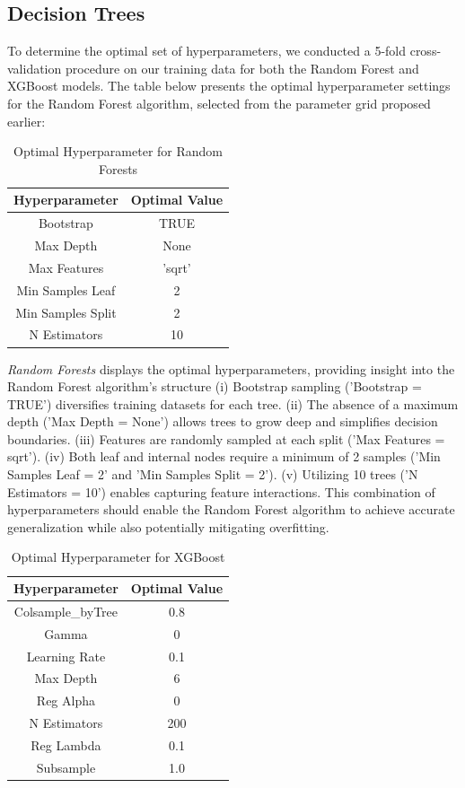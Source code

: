 \documentclass[conference]{IEEEtran}
\begin{document}
\subsection{Decision Trees}

To determine the optimal set of hyperparameters, we conducted a 5-fold cross-validation procedure on our training data for both the Random Forest and XGBoost models. The table below presents the optimal hyperparameter settings for the Random Forest algorithm, selected from the parameter grid proposed earlier:

\begin{table}[H]
\centering
\caption{Optimal Hyperparameter for Random Forests}
\begin{tabular}{|c|c|}
\hline
Hyperparameter & Optimal Value \\
\hline
Bootstrap & TRUE \\
\hline
Max Depth & None \\
\hline
Max Features & 'sqrt' \\
\hline
Min Samples Leaf & 2 \\
\hline
Min Samples Split & 2 \\
\hline
N Estimators & 10 \\
\hline
\end{tabular}
\label{tab:rf_hyper}
\end{table}

\emph{Random Forests} displays the optimal hyperparameters, providing insight into the Random Forest algorithm’s structure (i) Bootstrap sampling ('Bootstrap = TRUE') diversifies training datasets for each tree. (ii) The absence of a maximum depth ('Max Depth = None') allows trees to grow deep and simplifies decision boundaries. (iii) Features are randomly sampled at each split ('Max Features = sqrt'). (iv) Both leaf and internal nodes require a minimum of 2 samples ('Min Samples Leaf = 2' and 'Min Samples Split = 2'). (v) Utilizing 10 trees ('N Estimators = 10') enables capturing feature interactions. This combination of hyperparameters should enable the Random Forest algorithm to achieve accurate generalization while also potentially mitigating overfitting.

\begin{table}[H]
\centering
\caption{Optimal Hyperparameter for XGBoost}
\begin{tabular}{|c|c|}
\hline
Hyperparameter & Optimal Value \\
\hline
Colsample\_byTree & 0.8 \\
\hline
Gamma & 0 \\
\hline
Learning Rate & 0.1 \\
\hline
Max Depth & 6 \\
\hline
Reg Alpha & 0 \\
\hline
N Estimators & 200 \\
\hline
Reg Lambda & 0.1 \\
\hline
Subsample & 1.0 \\
\hline
\end{tabular}
\label{tab:xg_hyper}
\end{table}
\end{document}
